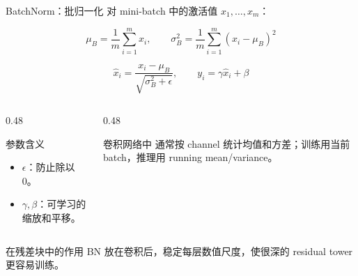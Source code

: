 \documentclass[UTF8,aspectratio=169,10pt]{ctexbeamer}
\begin{document}
\begin{frame}{BatchNorm：批归一化}
  \small
  对 mini-batch 中的激活值 $x_1,\ldots,x_m$：

  \[
    \mu_B=\frac{1}{m}\sum_{i=1}^m x_i,\qquad
    \sigma_B^2=\frac{1}{m}\sum_{i=1}^m (x_i-\mu_B)^2
  \]

  \[
    \hat{x}_i=\frac{x_i-\mu_B}{\sqrt{\sigma_B^2+\epsilon}},
    \qquad
    y_i=\gamma\hat{x}_i+\beta
  \]

  \begin{columns}[T,onlytextwidth]
    \begin{column}{0.48\textwidth}
      \begin{block}{参数含义}
        \begin{itemize}
          \item $\epsilon$：防止除以 0。
          \item $\gamma,\beta$：可学习的缩放和平移。
        \end{itemize}
      \end{block}
    \end{column}
    \begin{column}{0.48\textwidth}
      \begin{block}{卷积网络中}
        通常按 channel 统计均值和方差；训练用当前 batch，推理用 running mean/variance。
      \end{block}
    \end{column}
  \end{columns}

  \begin{alertblock}{在残差块中的作用}
    BN 放在卷积后，稳定每层数值尺度，使很深的 residual tower 更容易训练。
  \end{alertblock}
\end{frame}
\end{document}
